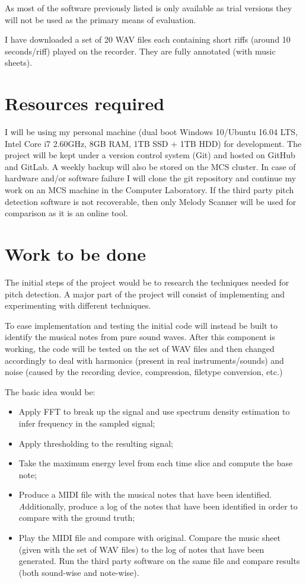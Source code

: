 \documentclass[12pt,a4paper,twoside]{article}
\begin{document}
As most of the software previously listed is only available as trial versions they will not be used as the primary means of evaluation.

I have downloaded a set of 20 WAV files each containing short riffs (around 10 seconds/riff) played on the recorder. They are fully annotated (with music sheets).

\section*{Resources required}

I will be using my personal machine (dual boot Windows 10/Ubuntu 16.04 LTS, Intel Core i7 2.60GHz, 8GB RAM, 1TB SSD + 1TB HDD) for development.
  The project will be kept under a version control system (Git) and hosted on GitHub and GitLab. A weekly backup will also be stored on the MCS cluster.
  In case of hardware and/or software failure I will clone the git repository and continue my work on an MCS machine in the Computer Laboratory. If the third party pitch detection software is not recoverable, then only Melody Scanner will be used for comparison as it is an online tool.

\section*{Work to be done}

The initial steps of the project would be to research the techniques needed for pitch detection.
A major part of the project will consist of implementing and experimenting with different techniques.

To ease implementation and testing the initial code will instead be built to identify the musical notes from pure sound waves.
After this component is working, the code will be tested on the set of WAV files and then changed accordingly to deal with harmonics (present in real instruments/sounds) and noise (caused by the recording device, compression, filetype conversion, etc.)

The basic idea would be:
\begin{itemize}
  \item Apply FFT to break up the signal and use spectrum density estimation to infer frequency in the sampled signal;
  \item Apply thresholding to the resulting signal;
  \item Take the maximum energy level from each time slice and compute the base note;
  \item Produce a MIDI file with the musical notes that have been identified.
  \emph Additionally, produce a log of the notes that have been identified in order to compare with the ground truth;
  \item Play the MIDI file and compare with original. Compare the music sheet (given with the set of WAV files) to the log of notes that have been generated. Run the third party software on the same file and compare results (both sound-wise and note-wise).
\end{itemize}
\end{document}

